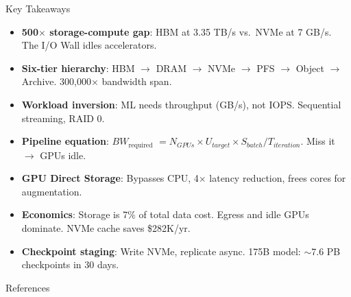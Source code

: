 \documentclass[aspectratio=169, 12pt]{beamer}
\newcommand{\IOWall}{I/O Wall}
\newcommand{\BWreq}{$BW_{\text{required}}$}
\begin{document}
\begin{frame}{Key Takeaways}

\scriptsize
\begin{itemize}\setlength\itemsep{0pt}
  \item \textbf{500$\times$ storage-compute gap}: HBM at 3.35 TB/s vs.\ NVMe at 7 GB/s. The \IOWall{} idles accelerators.
  \item \textbf{Six-tier hierarchy}: HBM $\to$ DRAM $\to$ NVMe $\to$ PFS $\to$ Object $\to$ Archive. 300,000$\times$ bandwidth span.
  \item \textbf{Workload inversion}: ML needs throughput (GB/s), not IOPS. Sequential streaming, RAID 0.
  \item \textbf{Pipeline equation}: \BWreq{} $= N_{GPUs} \times U_{target} \times S_{batch} / T_{iteration}$. Miss it $\to$ GPUs idle.
  \item \textbf{GPU Direct Storage}: Bypasses CPU, 4$\times$ latency reduction, frees cores for augmentation.
  \item \textbf{Economics}: Storage is 7\% of total data cost. Egress and idle GPUs dominate. NVMe cache saves \$282K/yr.
  \item \textbf{Checkpoint staging}: Write NVMe, replicate async. 175B model: $\sim$7.6 PB checkpoints in 30 days.
\end{itemize}

\end{frame}

\begin{frame}{References}
\note{
[1 min]
}

\small
{}

\end{frame}
\end{document}
